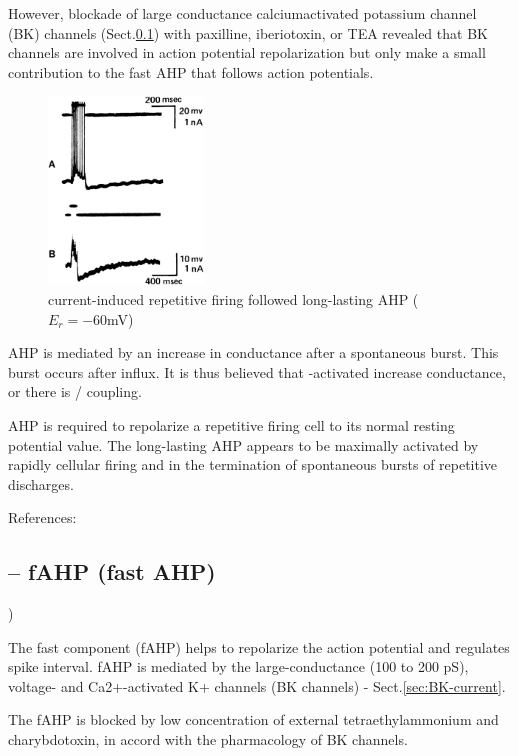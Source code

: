 However, blockade of large
conductance calciumactivated potassium channel (BK) channels
(Sect.\ref{sec:AHP-fast}) with paxilline, iberiotoxin, or TEA revealed that BK
channels are involved in action potential repolarization but only make a small
contribution to the fast AHP that follows action potentials.


\begin{figure}[hbt]
  \centerline{\includegraphics[height=5cm,
    angle=0]{./images/AHP.eps}}
\caption{current-induced repetitive firing followed long-lasting AHP ($E_r=-60$mV)~\citep{hotson1980ahp}}
\label{fig:AHP}
\end{figure}


AHP is mediated by an increase in  conductance after a
spontaneous burst. This burst occurs after  influx. It is
thus believed that -activated increase  conductance,
or there is / coupling.

AHP is required to repolarize a repetitive firing cell to its normal
resting potential value. The long-lasting AHP appears to be maximally
activated by rapidly cellular firing and in the termination of
spontaneous bursts of repetitive discharges. 

References:


\subsection{-- fAHP (fast AHP)}
\label{sec:AHP-fast}) 

The fast component (fAHP) helps to repolarize the action potential and regulates spike
interval. fAHP is mediated by the large-conductance (100 to 200 pS), voltage-
and  Ca2+-activated K+ channels (BK channels) - Sect.\ref{sec:BK-current}.

The fAHP is blocked by low concentration of external tetraethylammonium and
charybdotoxin, in accord with the pharmacology of BK channels.


